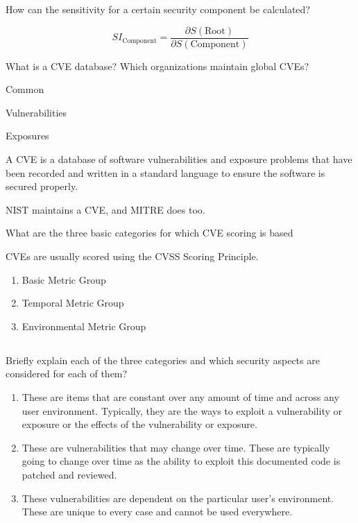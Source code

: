 \begin{questions}
\question{} How can the sensitivity for a certain security component be calculated?
  \begin{solution}
    \begin{equation}\label{eq:Sensitivity_Index}
      SI_{\text{Component}} = \frac{\partial S(\text{Root})}{\partial S(\text{Component})}
    \end{equation}
  \end{solution}

\question{} What is a CVE database? Which organizations maintain global CVEs?
  \begin{solution}
    \begin{description}[noitemsep]
    \item[C] Common
    \item[V] Vulnerabilities
    \item[E] Exposures
    \end{description}
    A CVE is a database of software vulnerabilities and exposure problems that have been recorded and written in a standard language to ensure the software is secured properly.

    NIST maintains a CVE, and MITRE does too.
  \end{solution}

\question{} What are the three basic categories for which CVE scoring is based
  \begin{solution}
    CVEs are usually scored using the CVSS Scoring Principle.
    \begin{enumerate}[noitemsep]
    \item Basic Metric Group
    \item Temporal Metric Group
    \item Environmental Metric Group
    \end{enumerate}
  \end{solution}

  \begin{parts}
  \part{} Briefly explain each of the three categories and which security aspects are considered for each of them?
    \begin{solution}
      \begin{enumerate}[noitemsep]
      \item These are items that are constant over any amount of time and across any user environment.
        Typically, they are the ways to exploit a vulnerability or exposure or the effects of the vulnerability or exposure.
      \item These are vulnerabilities that may change over time.
        These are typically going to change over time as the ability to exploit this documented code is patched and reviewed.
      \item These vulnerabilities are dependent on the particular user's environment.
        These are unique to every case and cannot be used everywhere.
      \end{enumerate}
    \end{solution}
  \end{parts}


\end{questions}
